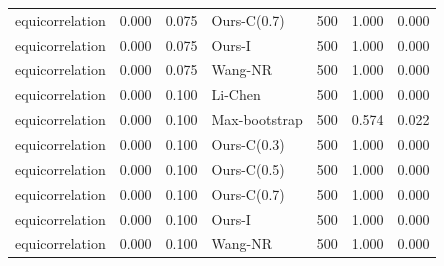 \begin{tabular}{lrrlrrr}
equicorrelation & 0.000 & 0.075 & Ours-C(0.7) & 500 & 1.000 & 0.000 \\
equicorrelation & 0.000 & 0.075 & Ours-I & 500 & 1.000 & 0.000 \\
equicorrelation & 0.000 & 0.075 & Wang-NR & 500 & 1.000 & 0.000 \\
equicorrelation & 0.000 & 0.100 & Li-Chen & 500 & 1.000 & 0.000 \\
equicorrelation & 0.000 & 0.100 & Max-bootstrap & 500 & 0.574 & 0.022 \\
equicorrelation & 0.000 & 0.100 & Ours-C(0.3) & 500 & 1.000 & 0.000 \\
equicorrelation & 0.000 & 0.100 & Ours-C(0.5) & 500 & 1.000 & 0.000 \\
equicorrelation & 0.000 & 0.100 & Ours-C(0.7) & 500 & 1.000 & 0.000 \\
equicorrelation & 0.000 & 0.100 & Ours-I & 500 & 1.000 & 0.000 \\
equicorrelation & 0.000 & 0.100 & Wang-NR & 500 & 1.000 & 0.000 \\
\bottomrule
\end{tabular}
